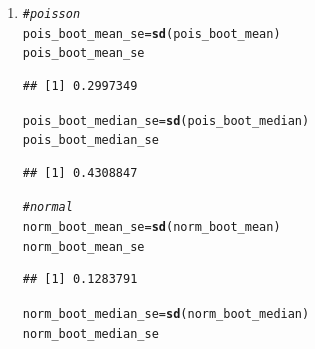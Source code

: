 \documentclass[12pt,english]{article}\usepackage[]{graphicx}\usepackage[]{xcolor}
\makeatletter
\newcommand{\hlcom}[1]{\textcolor[rgb]{0.678,0.584,0.686}{\textit{#1}}}%
\newcommand{\hldef}[1]{\textcolor[rgb]{0.345,0.345,0.345}{#1}}%
\newcommand{\hlkwb}[1]{\textcolor[rgb]{0.69,0.353,0.396}{#1}}%
\newcommand{\hlkwd}[1]{\textcolor[rgb]{0.737,0.353,0.396}{\textbf{#1}}}%
\newenvironment{kframe}{%
 \def\at@end@of@kframe{}%
 \ifinner\ifhmode%
  \def\at@end@of@kframe{\end{minipage}}%
  \begin{minipage}{\columnwidth}%
 \fi\fi%
 \def\FrameCommand##1{\hskip\@totalleftmargin \hskip-\fboxsep
 \colorbox{shadecolor}{##1}\hskip-\fboxsep
     \hskip-\linewidth \hskip-\@totalleftmargin \hskip\columnwidth}%
 \MakeFramed {\advance\hsize-\width
   \@totalleftmargin\z@ \linewidth\hsize
   \@setminipage}}%
 {\par\unskip\endMakeFramed%
 \at@end@of@kframe}
\newenvironment{knitrout}{}{} %
\makeatother
\begin{document}
\begin{enumerate}[label=\arabic*.]
\begin{enumerate}[label=(\alph*)]
\begin{enumerate}[label=(\alph*)]
\begin{knitrout}
\begin{kframe}
\begin{alltt}
\hldef{pois_boot_median} \hlkwb{=} \hlkwd{bootmedian}\hldef{(F_pois,B)}
\hlkwd{mean}\hldef{(pois_boot_median)}
\end{alltt}
\begin{verbatim}
## [1] 3.968
\end{verbatim}
\begin{alltt}
\hlcom{#normal}
\hldef{norm_boot_mean} \hlkwb{=} \hlkwd{bootmean}\hldef{(F_norm,B)}
\hlkwd{mean}\hldef{(norm_boot_mean)}
\end{alltt}
\begin{verbatim}
## [1] 0.0586859
\end{verbatim}
\begin{alltt}
\hldef{norm_boot_median} \hlkwb{=} \hlkwd{bootmedian}\hldef{(F_norm,B)}
\hlkwd{mean}\hldef{(norm_boot_median)}
\end{alltt}
\begin{verbatim}
## [1] 0.03506994
\end{verbatim}
\end{kframe}
\end{knitrout}
					\item
\begin{knitrout}
\color{fgcolor}\begin{kframe}
\begin{alltt}
\hlcom{#poisson}
\hldef{pois_boot_mean_se} \hlkwb{=} \hlkwd{sd}\hldef{(pois_boot_mean)}
\hldef{pois_boot_mean_se}
\end{alltt}
\begin{verbatim}
## [1] 0.2997349
\end{verbatim}
\begin{alltt}
\hldef{pois_boot_median_se} \hlkwb{=} \hlkwd{sd}\hldef{(pois_boot_median)}
\hldef{pois_boot_median_se}
\end{alltt}
\begin{verbatim}
## [1] 0.4308847
\end{verbatim}
\begin{alltt}
\hlcom{#normal}
\hldef{norm_boot_mean_se} \hlkwb{=} \hlkwd{sd}\hldef{(norm_boot_mean)}
\hldef{norm_boot_mean_se}
\end{alltt}
\begin{verbatim}
## [1] 0.1283791
\end{verbatim}
\begin{alltt}
\hldef{norm_boot_median_se} \hlkwb{=} \hlkwd{sd}\hldef{(norm_boot_median)}
\hldef{norm_boot_median_se}
\end{alltt}

\end{kframe}
\end{knitrout}
\end{enumerate}
\end{enumerate}
\end{enumerate}
\end{document}
